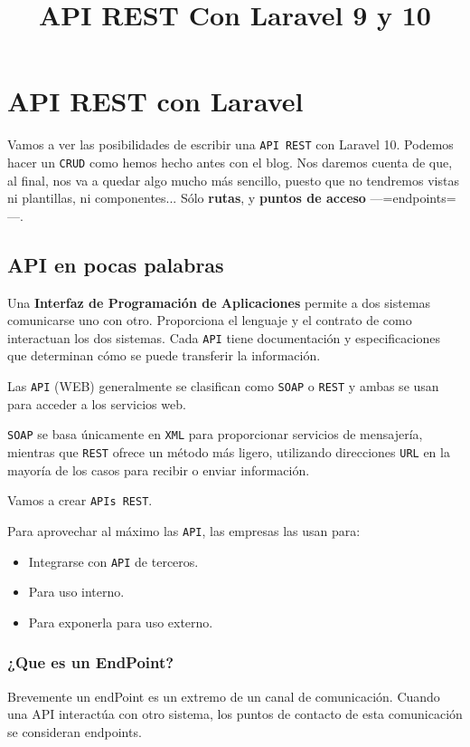 \documentclass[11pt]{article}
\date{}
\title{API REST Con Laravel 9 y 10}
\begin{document}
\maketitle
\setcounter{tocdepth}{3}
\tableofcontents

\setlength\parindent{10pt}

\section{API REST con Laravel}
\label{sec:org7a719ac}
Vamos a ver las posibilidades de escribir una \texttt{API REST} con
Laravel 10. Podemos hacer un \texttt{CRUD} como hemos hecho antes con el
blog. Nos daremos cuenta de que, al final, nos va a quedar algo mucho
más sencillo, puesto que no tendremos vistas ni plantillas, ni
componentes... Sólo \textbf{rutas}, y \textbf{puntos de acceso} —=endpoints=—.

\subsection{API en pocas palabras}
\label{sec:orgafbf7f5}
Una \textbf{Interfaz de Programación de Aplicaciones} permite a dos sistemas
comunicarse uno con otro. Proporciona el lenguaje y el contrato de
como interactuan los dos sistemas. Cada \texttt{API} tiene documentación y
especificaciones que determinan cómo se puede transferir la
información.

Las \texttt{API} (WEB) generalmente se clasifican como \texttt{SOAP} o \texttt{REST} y
ambas se usan para acceder a los servicios web.

\texttt{SOAP} se basa únicamente en \texttt{XML} para proporcionar servicios de
mensajería, mientras que \texttt{REST} ofrece un método más ligero, utilizando
direcciones \texttt{URL} en la mayoría de los casos para recibir o enviar
información.

Vamos a crear \texttt{APIs REST}.

Para aprovechar al máximo las \texttt{API}, las empresas las usan para:
\begin{itemize}
\item Integrarse con \texttt{API} de terceros.
\item Para uso interno.
\item Para exponerla para uso externo.
\end{itemize}



\page


\subsubsection{¿Que es un EndPoint?}
\label{sec:orgbce42ca}
Brevemente un endPoint es un extremo de un canal de
comunicación. Cuando una API interactúa con otro sistema, los puntos
de contacto de esta comunicación se consideran endpoints.
\end{document}
